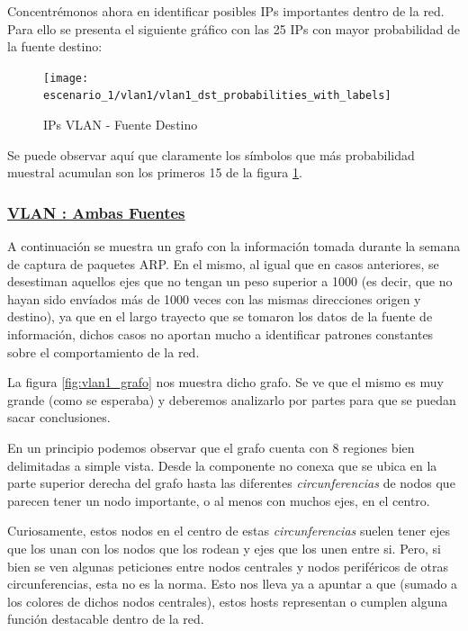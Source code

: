 \par Concentr\'emonos ahora en identificar posibles IPs importantes dentro de la red.
Para ello se presenta el siguiente gr\'afico con las 25 IPs con mayor probabilidad
de la fuente destino:

\begin{figure}[!ht]
    \centering
    \texttt{[image: escenario\_1/vlan1/vlan1\_dst\_probabilities\_with\_labels]}
    \caption{IPs VLAN  - Fuente Destino}
    \label{fig:vlan1_dst_prob_ips}
\end{figure}

\par Se puede observar aqu\'i que claramente los s\'imbolos que m\'as probabilidad muestral
acumulan son los primeros 15 de la figura \ref{fig:vlan1_dst_prob_ips}.


\subsubsection*{\underline{VLAN : Ambas Fuentes}}\label{subsubsec:vlan1_src_dst}
\par A continuaci\'on se muestra un grafo con la informaci\'on tomada durante la semana de
captura de paquetes ARP. En el mismo, al igual que en casos anteriores, se
desestiman aquellos ejes que no tengan un peso superior a 1000 (es decir, que
no hayan sido env\'iados m\'as de 1000 veces con las mismas direcciones
origen y destino), ya que en el largo trayecto que se tomaron los datos
de la fuente de informaci\'on, dichos casos no aportan mucho a identificar
patrones constantes sobre el comportamiento de la red.

\par La figura \ref{fig:vlan1_grafo} nos muestra dicho grafo. Se ve que el mismo es muy grande
(como se esperaba) y deberemos analizarlo por partes para que se puedan sacar
conclusiones.

\par En un principio podemos observar que el grafo cuenta con 8 regiones bien delimitadas
a simple vista. Desde la componente no conexa que se ubica en la parte superior
derecha del grafo hasta las diferentes \textit{circunferencias} de nodos que parecen
tener un nodo importante, o al menos con muchos ejes, en el centro.

\par Curiosamente, estos nodos en el centro de estas \textit{circunferencias} suelen
tener ejes que los unan con los nodos que los rodean y ejes que los unen entre si. Pero,
si bien se ven algunas peticiones entre nodos centrales y nodos perif\'ericos de otras
circunferencias, esta no es la norma. Esto nos lleva ya a apuntar a que (sumado a los
colores de dichos nodos centrales), estos hosts representan o cumplen alguna funci\'on
destacable dentro de la red.

